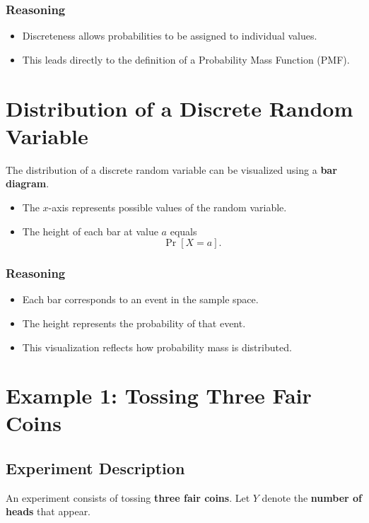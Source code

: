 \documentclass[11pt]{article}
\begin{document}
\subsubsection*{Reasoning}
\begin{itemize}
    \item Discreteness allows probabilities to be assigned to individual values.
    \item This leads directly to the definition of a Probability Mass Function (PMF).
\end{itemize}

\section{Distribution of a Discrete Random Variable}

The distribution of a discrete random variable can be visualized using a \textbf{bar diagram}.
\begin{itemize}
    \item The $x$-axis represents possible values of the random variable.
    \item The height of each bar at value $a$ equals
    \[
    \Pr[X = a].
    \]
\end{itemize}

\subsubsection*{Reasoning}
\begin{itemize}
    \item Each bar corresponds to an event in the sample space.
    \item The height represents the probability of that event.
    \item This visualization reflects how probability mass is distributed.
\end{itemize}

\section{Example 1: Tossing Three Fair Coins}

\subsection{Experiment Description}

An experiment consists of tossing \textbf{three fair coins}.  
Let $Y$ denote the \textbf{number of heads} that appear.
\end{document}
